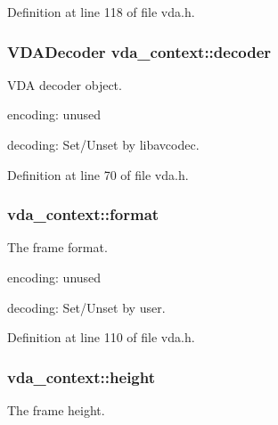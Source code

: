 Definition at line 118 of file vda.\+h.

\subsubsection[{\texorpdfstring{decoder}{decoder}}]{\setlength{\rightskip}{0pt plus 5cm}V\+D\+A\+Decoder vda\+\_\+context\+::decoder}\hypertarget{structvda__context_a760651dcebd505fd9a4cdea29db99ebf}{}\label{structvda__context_a760651dcebd505fd9a4cdea29db99ebf}
V\+DA decoder object.


\begin{DoxyItemize}
\item encoding\+: unused
\item decoding\+: Set/\+Unset by libavcodec. 
\end{DoxyItemize}

Definition at line 70 of file vda.\+h.

\subsubsection[{\texorpdfstring{format}{format}}]{ vda\+\_\+context\+::format}\hypertarget{structvda__context_a0ea444e176f930513b19de5e0468ab0f}{}\label{structvda__context_a0ea444e176f930513b19de5e0468ab0f}
The frame format.


\begin{DoxyItemize}
\item encoding\+: unused
\item decoding\+: Set/\+Unset by user. 
\end{DoxyItemize}

Definition at line 110 of file vda.\+h.

\subsubsection[{\texorpdfstring{height}{height}}]{ vda\+\_\+context\+::height}\hypertarget{structvda__context_aa404ef10a896b154cd41829be525d0e3}{}\label{structvda__context_aa404ef10a896b154cd41829be525d0e3}
The frame height.


